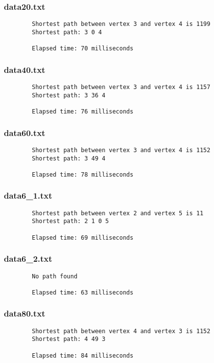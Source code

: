 \documentclass{article}
\begin{document}
    \subsubsection*{data20.txt}
    \begin{verbatim}
        Shortest path between vertex 3 and vertex 4 is 1199
        Shortest path: 3 0 4

        Elapsed time: 70 milliseconds
    \end{verbatim}

    \subsubsection*{data40.txt}
    \begin{verbatim}
        Shortest path between vertex 3 and vertex 4 is 1157
        Shortest path: 3 36 4

        Elapsed time: 76 milliseconds
    \end{verbatim}

    \subsubsection*{data60.txt}
    \begin{verbatim}
        Shortest path between vertex 3 and vertex 4 is 1152
        Shortest path: 3 49 4

        Elapsed time: 78 milliseconds
    \end{verbatim}

    \subsubsection*{data6\_1.txt}
    \begin{verbatim}
        Shortest path between vertex 2 and vertex 5 is 11
        Shortest path: 2 1 0 5

        Elapsed time: 69 milliseconds
    \end{verbatim}

    \subsubsection*{data6\_2.txt}
    \begin{verbatim}
        No path found

        Elapsed time: 63 milliseconds
    \end{verbatim}

    \subsubsection*{data80.txt}
    \begin{verbatim}
        Shortest path between vertex 4 and vertex 3 is 1152
        Shortest path: 4 49 3

        Elapsed time: 84 milliseconds
    \end{verbatim}
\end{document}
